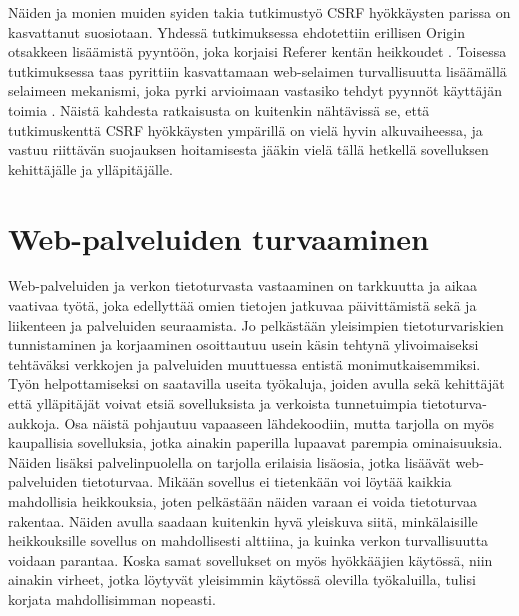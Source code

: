 Näiden ja monien muiden syiden takia tutkimustyö CSRF hyökkäysten parissa on kasvattanut suosiotaan. Yhdessä tutkimuksessa ehdotettiin erillisen Origin
otsakkeen lisäämistä pyyntöön, joka korjaisi Referer kentän heikkoudet \cite{CSRF}. Toisessa tutkimuksessa taas pyrittiin kasvattamaan web-selaimen turvallisuutta
lisäämällä selaimeen mekanismi, joka pyrki arvioimaan vastasiko tehdyt pyynnöt käyttäjän toimia \cite{CSRFb}. Näistä kahdesta ratkaisusta on kuitenkin nähtävissä se,
että tutkimuskenttä CSRF hyökkäysten ympärillä on vielä hyvin alkuvaiheessa, ja vastuu riittävän suojauksen hoitamisesta jääkin vielä tällä hetkellä 
sovelluksen kehittäjälle ja ylläpitäjälle.

\section{Web-palveluiden turvaaminen}

Web-palveluiden ja verkon tietoturvasta vastaaminen on tarkkuutta ja aikaa vaativaa työtä, joka edellyttää omien tietojen jatkuvaa päivittämistä sekä ja liikenteen ja palveluiden
seuraamista. Jo pelkästään yleisimpien tietoturvariskien tunnistaminen ja korjaaminen osoittautuu usein käsin tehtynä ylivoimaiseksi tehtäväksi verkkojen ja palveluiden
muuttuessa entistä monimutkaisemmiksi. Työn helpottamiseksi on saatavilla useita työkaluja, joiden avulla sekä kehittäjät että ylläpitäjät voivat
etsiä sovelluksista ja verkoista tunnetuimpia tietoturva-aukkoja. Osa näistä pohjautuu vapaaseen lähdekoodiin, mutta tarjolla on myös kaupallisia sovelluksia, jotka ainakin 
paperilla lupaavat parempia ominaisuuksia. Näiden lisäksi palvelinpuolella on tarjolla erilaisia lisäosia, jotka lisäävät web-palveluiden tietoturvaa. 
Mikään sovellus ei tietenkään voi löytää kaikkia mahdollisia heikkouksia, joten pelkästään näiden varaan ei voida tietoturvaa rakentaa. Näiden avulla 
saadaan kuitenkin hyvä yleiskuva siitä, minkälaisille heikkouksille sovellus on mahdollisesti alttiina, ja kuinka verkon turvallisuutta voidaan parantaa. Koska samat 
sovellukset on myös hyökkääjien käytössä, niin ainakin virheet, jotka löytyvät yleisimmin käytössä olevilla työkaluilla, tulisi korjata mahdollisimman nopeasti. 

